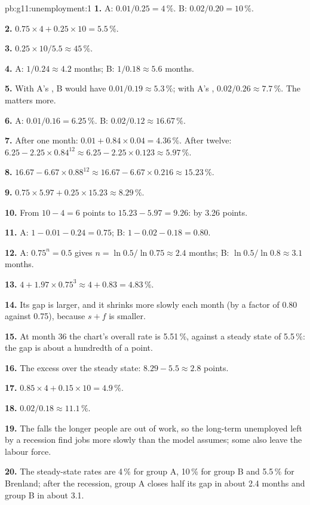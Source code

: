 \begin{solution}{pb:g11:unemployment:1}
\textbf{1.} A: $0.01/0.25 = 4\,\%$. B: $0.02/0.20 = 10\,\%$.

\textbf{2.} $0.75 \times 4 + 0.25 \times 10 = 5.5\,\%$.

\textbf{3.} $0.25 \times 10/5.5 \approx 45\,\%$.

\textbf{4.} A: $1/0.24 \approx 4.2$ months; B: $1/0.18 \approx 5.6$ months.

\textbf{5.} With A's , B would have $0.01/0.19 \approx 5.3\,\%$; with A's , $0.02/0.26 \approx 7.7\,\%$. The  matters more.

\textbf{6.} A: $0.01/0.16 = 6.25\,\%$. B: $0.02/0.12 \approx 16.67\,\%$.

\textbf{7.} After one month: $0.01 + 0.84 \times 0.04 = 4.36\,\%$. After twelve: $6.25 - 2.25 \times 0.84^{12} \approx 6.25 - 2.25 \times 0.123 \approx 5.97\,\%$.

\textbf{8.} $16.67 - 6.67 \times 0.88^{12} \approx 16.67 - 6.67 \times 0.216 \approx 15.23\,\%$.

\textbf{9.} $0.75 \times 5.97 + 0.25 \times 15.23 \approx 8.29\,\%$.

\textbf{10.} From $10 - 4 = 6$ points to $15.23 - 5.97 = 9.26$: by 3.26 points.

\textbf{11.} A: $1 - 0.01 - 0.24 = 0.75$; B: $1 - 0.02 - 0.18 = 0.80$.

\textbf{12.} A: $0.75^n = 0.5$ gives $n = \ln 0.5/\ln 0.75 \approx 2.4$ months; B: $\ln 0.5/\ln 0.8 \approx 3.1$ months.

\textbf{13.} $4 + 1.97 \times 0.75^3 \approx 4 + 0.83 = 4.83\,\%$.

\textbf{14.} Its gap is larger, and it shrinks more slowly each month (by a factor of 0.80 against 0.75), because $s + f$ is smaller.

\textbf{15.} At month 36 the chart's overall rate is 5.51\,\%, against a steady state of 5.5\,\%: the gap is about a hundredth of a point.

\textbf{16.} The excess over the steady state: $8.29 - 5.5 \approx 2.8$ points.

\textbf{17.} $0.85 \times 4 + 0.15 \times 10 = 4.9\,\%$.

\textbf{18.} $0.02/0.18 \approx 11.1\,\%$.

\textbf{19.} The  falls the longer people are out of work, so the long-term unemployed left by a recession find jobs more slowly than the model assumes; some
also leave the labour force.

\textbf{20.} The steady-state rates are 4\,\% for group A, 10\,\% for group B and 5.5\,\% for Brenland; after the recession, group A closes half its gap in about 2.4 months and
group B in about 3.1.
\end{solution}
